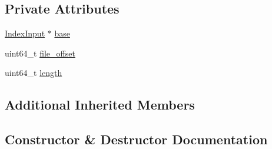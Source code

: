 \subsection*{Private Attributes}
\begin{DoxyCompactItemize}
\item 
\mbox{\hyperlink{classlucene_1_1core_1_1store_1_1IndexInput}{Index\+Input}} $\ast$ \mbox{\hyperlink{classlucene_1_1core_1_1store_1_1BufferedIndexInput_1_1SlicedIndexInput_a6d131ffd7aa3ade38037f63e14f3e89a}{base}}
\item 
uint64\+\_\+t \mbox{\hyperlink{classlucene_1_1core_1_1store_1_1BufferedIndexInput_1_1SlicedIndexInput_a4f9f540d66ed94ed6728be1f058b2805}{file\+\_\+offset}}
\item 
uint64\+\_\+t \mbox{\hyperlink{classlucene_1_1core_1_1store_1_1BufferedIndexInput_1_1SlicedIndexInput_a57edb1c87b6063d4bfe1d3c6b1e7629c}{length}}
\end{DoxyCompactItemize}
\subsection*{Additional Inherited Members}


\subsection{Constructor \& Destructor Documentation}
\mbox{\label{classlucene_1_1core_1_1store_1_1BufferedIndexInput_1_1SlicedIndexInput_a933e246d7fe6cf113f0687c5da37b79a}} 
